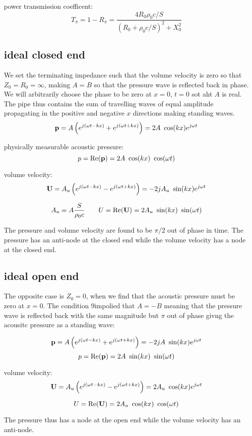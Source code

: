 \documentclass[10pt, a4paper, twocolumn]{article}
\begin{document}
power transmission coefficent:
\[T_\pi = 1-R_\pi
= \frac{4R_0\rho _0c/S}{(R_0+\rho _0c/S)^2 + X_0^2}\]

\subsection{ideal closed end}

We set the terminating impedance such that the volume velocity is zero so that $Z_0=R_0=\infty$, making $A=B$ so that the pressure wave is reflected back in phase. We will arbitrarily choose the phase to be zero at $x=0$, $t=0$ sot aht $A$ is real. The pipe thus contains the sum of travelling waves of equal amplitude propagating in the positive and negative $x$ directions making standing waves.
\[\vb p
= A\left(e^{j(\omega t-kx)} + e^{j(\omega t+kx)} \right)
=2A\ \cos(kx) e^{j\omega t}\]

physically measurable acoustic pressure:
\[p = \Re(\vb p) = 2A\ \cos (kx)\ \cos (\omega t)\]

volume velocity:
\[\vb U
= A_u \left(e^{j(\omega t-kx)} - e^{j(\omega t+kx)} \right)
=-2jA_u\ \sin (kx)e^{j\omega t} \]

\[A_u = A\frac{S}{\rho _0 c}
\qquad U =\Re(\vb U) = 2A_u\ \sin (kx)\ \sin (\omega t)\]

The pressure and volume velocity are found to be $\pi/2$ out of phase in time. The pressure has an anti-node at the closed end while the volume velocity has a node at the closed end.

\subsection{ideal open end}

The opposite case is $Z_0=0$, when we find that the acoustic pressure must be zero at $x=0$. The condition 9impolied that $A=-B$ meaning that the pressure wave is reflected back with the same magnitude but $\pi$ out of phase givng the acousitc pressure as a standing wave:

\[\vb p
= A\left(e^{j(\omega t-kx)} + e^{j(\omega t+kx)} \right)
=-2jA\ \sin (kx) e^{j\omega t}\]
\[p = \Re(\vb p) = 2A\ \sin(kx)\ \sin(\omega t)\]

volume velocity:
\[\vb U
= A_u \left(e^{j(\omega t-kx)} - e^{j(\omega t+kx)} \right)
= 2A_u \ \cos(kx)e^{j\omega t} \]

\[U =\Re(\vb U) = 2A_u\ \cos (kx)\ \cos(\omega t)\]

The pressure thus has a node at the open end while the volume velocity has an anti-node.
\end{document}
